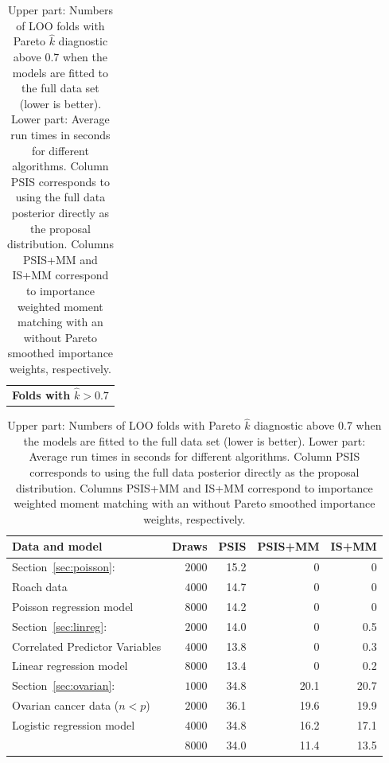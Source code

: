 \documentclass[12pt]{article}
\begin{document}
\begin{appendices}
\begin{table}[tb]
\centering
\caption{Upper part: Numbers of LOO folds with Pareto $\hat{k}$ diagnostic above 0.7 when the models are fitted to the full data set (lower is better).
Lower part: Average run times in seconds for different algorithms.
%
Column PSIS corresponds to using the full data posterior directly
as the proposal distribution.
Columns PSIS+MM and IS+MM correspond to importance weighted
moment matching with an without Pareto smoothed importance weights, respectively.}
\label{tab:results_raw}
\begin{tabular}{ c }
%
%
\hspace{3cm} \textbf{Folds with} $\hat{k} > 0.7$ \hspace{3cm} \\
\end{tabular}
\begin{tabular}{ l r r r r }
\toprule
Data and model & Draws & PSIS & PSIS+MM & IS+MM \\
\midrule

%
%


%
Section~\ref{sec:poisson}:         & $2000$  & 15.2 & 0 & 0  \\
Roach data                         & $4000$  & 14.7 & 0 & 0 \\
Poisson regression model           & $8000$  & 14.2 & 0 & 0 \\

\hline                                    

Section~\ref{sec:linreg}:        & $2000$  & 14.0 & 0 & 0.5  \\
Correlated Predictor Variables                              & $4000$  & 13.8 & 0 & 0.3  \\
Linear regression model                                 & $8000$  & 13.4 & 0 & 0.2 \\

\hline                                    
Section~\ref{sec:ovarian}:        & $1000$  & 34.8 & 20.1 & 20.7  \\
Ovarian cancer data ($n < p$)               & $2000$  & 36.1 & 19.6 & 19.9  \\
Logistic regression model         & $4000$  & 34.8 & 16.2 & 17.1  \\
                                  & $8000$  & 34.0 & 11.4 & 13.5 \\

\bottomrule

\end{tabular}


\end{table}
\end{appendices}
\end{document}
